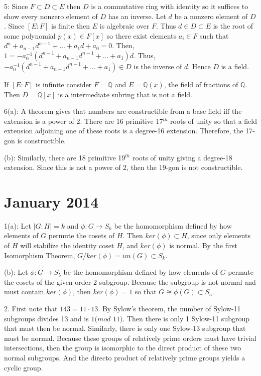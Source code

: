 \documentclass[12pt]{article}
\begin{document}
5: Since $F \subset D \subset E$ then $D$ is a commutative ring with identity so it suffices to show every nonzero element of $D$ has an inverse.  Let $d$ be a nonzero element of $D$.  Since $[E:F]$ is finite then $E$ is algebraic over $F$.  Thus $d \in D \subset E$ is the root of some polynomial $p(x) \in F[x]$ so there exist elements $a_i \in F$ such that $d^n + a_{n-1} d^{n-1} + \ldots + a_1 d + a_0 = 0.$ Then, $1 = -a_0^{-1} (d^{n-1} + a_{n-1} d^{n-1} + \ldots + a_1) d.$ Thus, $-a_0^{-1} (d^{n-1} + a_{n-1} d^{n-1} + \ldots + a_1) \in D$ is the inverse of $d$.  Hence $D$ is a field. \newline

If $[E:F]$ is infinite consider $F= \mathbb{Q}$ and $E = \mathbb{Q}(x)$, the field of fractions of $\mathbb{Q}$.  Then $D= \mathbb{Q}[x]$ is a intermediate subring that is not a field. \newline

6(a): A theorem gives that numbers are constructible from a base field iff the extension is a power of 2. There are 16 primitive 17$^{th}$ roots of unity so that a field extension adjoining one of these roots is a degree-16 extension. Therefore, the 17-gon is constructible. \newline

(b): Similarly, there are 18 primitive 19$^{th}$ roots of unity giving a degree-18 extension. Since this is not a power of 2, then the 19-gon is not constructible.

\section{January 2014}

1(a): Let $|G:H|=k$ and $\phi:G \rightarrow S_k$ be the homomorphism defined by how elements of $G$ permute the cosets of $H$. Then $ker(\phi) \subset H$, since only elements of $H$ will stabilize the identity coset $H$, and $ker(\phi)$ is normal. By the first Isomorphism Theorem, $G / ker(\phi) = im(G) \subset S_k$. \newline

(b): Let $\phi: G \rightarrow S_5$ be the homomorphism defined by how elements of $G$ permute the cosets of the given order-2 subgroup. Because the subgroup is not normal and must contain $ker(\phi)$, then $ker(\phi)=1$ so that $G \cong \phi(G) \subset S_5$. \newline

2. First note that $143 = 11 \cdot 13$. By Sylow's theorem, the number of Sylow-11 subgroups divides 13 and is $1 (mod$ $11)$. Then there is only 1 Sylow-11 subgroup that must then be normal. Similarly, there is only one Sylow-13 subgroup that must be normal. Because these groups of relatively prime orders must have trivial intersections, then the group is isomorphic to the direct product of these two normal subgroups. And the directo product of relatively prime groups yields a cyclic group. \newline
\end{document}
